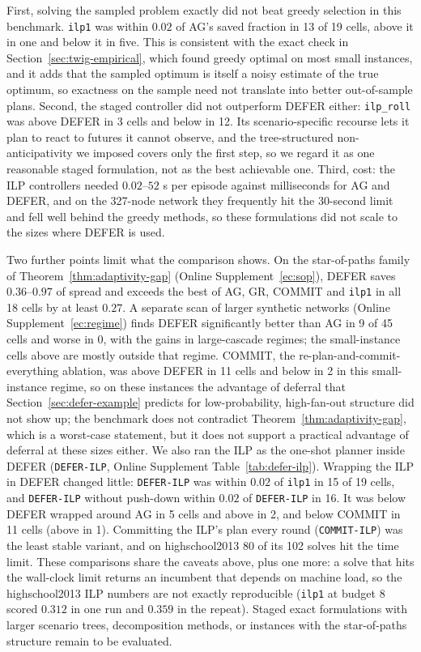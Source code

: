 \documentclass[ijoc,sglanonrev]{informs4}
\begin{document}
First, solving the sampled problem exactly did not beat greedy selection in
this benchmark. \texttt{ilp1} was within $0.02$ of AG's saved fraction in 13
of 19 cells, above it in one and below it in five. This is consistent with the
exact check in Section~\ref{sec:twig-empirical}, which found greedy optimal on
most small instances, and it adds that the sampled optimum is itself a noisy
estimate of the true optimum, so exactness on the sample need not translate
into better out-of-sample plans. Second, the staged controller did not
outperform DEFER either: \texttt{ilp\_roll} was above DEFER in 3 cells and
below in 12. Its scenario-specific recourse lets it plan to react to futures it
cannot observe, and the tree-structured non-anticipativity we imposed covers
only the first step, so we regard it as one reasonable staged formulation, not
as the best achievable one. Third, cost: the ILP controllers needed
$0.02$--$52$ s per episode against milliseconds for AG and DEFER, and on the
327-node network they frequently hit the 30-second limit and fell well behind
the greedy methods, so these formulations did not scale to the sizes where
DEFER is used.

Two further points limit what the comparison shows. On the star-of-paths family
of Theorem~\ref{thm:adaptivity-gap} (Online Supplement~\ref{ec:sop}), DEFER
saves $0.36$--$0.97$ of spread and exceeds the best of AG, GR, COMMIT and
\texttt{ilp1} in all 18 cells by at least $0.27$. A separate scan of larger
synthetic networks (Online Supplement~\ref{ec:regime}) finds DEFER significantly
better than AG in 9 of 45 cells and worse in 0, with the gains in large-cascade regimes; the
small-instance cells above are mostly outside that regime. COMMIT, the
re-plan-and-commit-everything ablation, was above DEFER in 11 cells and below
in 2 in this small-instance regime, so on these instances the advantage of
deferral that Section~\ref{sec:defer-example} predicts for low-probability,
high-fan-out structure did not show up; the benchmark does not contradict
Theorem~\ref{thm:adaptivity-gap}, which is a worst-case statement, but it
does not support a practical advantage of deferral at these sizes either. We
also ran the ILP as the one-shot planner inside DEFER
(\texttt{DEFER-ILP}, Online Supplement Table~\ref{tab:defer-ilp}). Wrapping the
ILP in DEFER changed little: \texttt{DEFER-ILP} was within $0.02$ of
\texttt{ilp1} in 15 of 19 cells, and \texttt{DEFER-ILP} without push-down
within $0.02$ of \texttt{DEFER-ILP} in 16. It was below DEFER wrapped around AG in 5
cells and above in 2, and below COMMIT in 11 cells (above in 1). Committing the
ILP's plan every round (\texttt{COMMIT-ILP}) was the least stable variant,
and on highschool2013 80 of its 102 solves hit the time limit. These
comparisons share the caveats above, plus one more: a solve that hits the
wall-clock limit returns an incumbent that depends on machine load, so the
highschool2013 ILP numbers are not exactly reproducible (\texttt{ilp1} at
budget $8$ scored $0.312$ in one run and $0.359$ in the repeat). Staged exact formulations with larger scenario trees, decomposition methods, or
instances with the star-of-paths structure remain to be evaluated.
\end{document}
